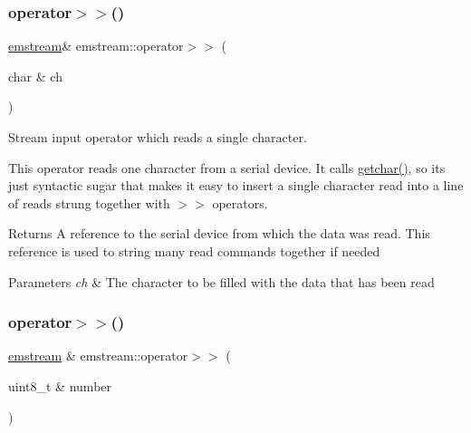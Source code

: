 \subsubsection{\texorpdfstring{operator$>$$>$()}{operator>>()}\hspace{0.1cm}{\footnotesize\ttfamily [1/8]}}
{\footnotesize\ttfamily \mbox{\hyperlink{classemstream}{emstream}}\& emstream\+::operator$>$$>$ (\begin{DoxyParamCaption}\item[{char \&}]{ch }\end{DoxyParamCaption})\hspace{0.3cm}{\ttfamily [inline]}}



Stream input operator which reads a single character. 

This operator reads one character from a serial device. It calls {\ttfamily \mbox{\hyperlink{classemstream_a41f0814540d5baa7312310c59077a248}{getchar()}}}, so it\textquotesingle{}s just syntactic sugar that makes it easy to insert a single character read into a line of reads strung together with {\ttfamily $>$$>$} operators. \begin{DoxyReturn}{Returns}
A reference to the serial device from which the data was read. This reference is used to string many read commands together if needed 
\end{DoxyReturn}

\begin{DoxyParams}{Parameters}
{\em ch} & The character to be filled with the data that has been read \\
\hline
\end{DoxyParams}
\mbox{\label{classemstream_ab27cadcdfb7256a05c2474c954fd02b8}} 
\subsubsection{\texorpdfstring{operator$>$$>$()}{operator>>()}\hspace{0.1cm}{\footnotesize\ttfamily [2/8]}}
{\footnotesize\ttfamily \mbox{\hyperlink{classemstream}{emstream}} \& emstream\+::operator$>$$>$ (\begin{DoxyParamCaption}\item[{uint8\+\_\+t \&}]{number }\end{DoxyParamCaption})}




